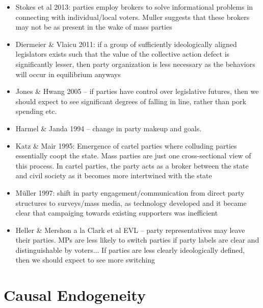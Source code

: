 \documentclass[12pt]{article}
\begin{document}
\begin{itemize}
\begin{itemize}
    \end{itemize}
    \item Stokes et al 2013: parties employ brokers to solve informational problems in connecting with individual/local voters. Muller suggests that these brokers may not be as present in the wake of mass parties
    \item Diermeier \& Vlaicu 2011: if a group of sufficiently ideologically aligned legislators exists such that the value of the collective action defect is significantly lesser, then party organization is less necessary as the behaviors will occur in equilibrium anyways
    \item Jones \& Hwang 2005 -- if parties have control over legislative futures, then we should expect to see significant degrees of falling in line, rather than pork spending etc.
    \item Harmel \& Janda 1994 -- change in party makeup and goals. 
    \item Katz \& Mair 1995: Emergence of cartel parties where colluding parties essentially coopt the state. Mass parties are just one cross-sectional view of this process. In cartel parties, the party acts as a broker between the state and civil society as it becomes more intertwined with the state
    \item Müller 1997: shift in party engagement/communication from direct party structures to surveys/mass media, as technology developed and it became clear that campaiging towards existing supporters was inefficient
    \item Heller \& Mershon a la Clark et al EVL -- party representatives may leave their parties. MPs are less likely to switch parties if party labels are clear and distinguishable by voters... If parties are less clearly ideologically defined, then we should expect to see more switching
\end{itemize}














\section*{Causal Endogeneity}
\end{document}
